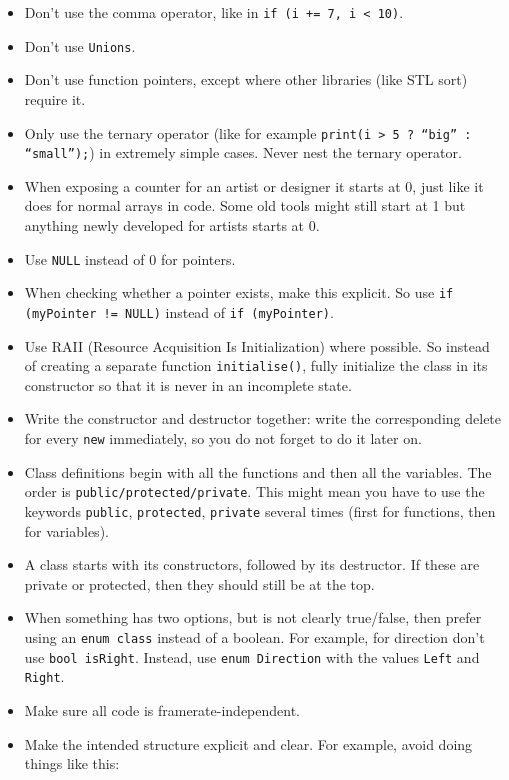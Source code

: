 \documentclass{article}
\begin{document}
\begin{itemize}
    \item Don't use the comma operator, like in \texttt{if (i += 7, i < 10)}.
    \item Don't use \texttt{Unions}.
    \item Don't use function pointers, except where other libraries (like STL sort) require it.
    \item Only use the ternary operator (like for example \texttt{print(i > 5 ? “big” : “small”);}) in extremely simple cases. Never nest the ternary operator.
    \item When exposing a counter for an artist or designer it starts at 0, just like it does for normal arrays in code. Some old tools might still start at 1 but anything newly developed for artists starts at 0.
    \item Use \texttt{NULL} instead of 0 for pointers.
    \item When checking whether a pointer exists, make this explicit. So use \texttt{if (myPointer != NULL)} instead of \texttt{if (myPointer)}.
    \item Use RAII (Resource Acquisition Is Initialization) where possible. So instead of creating a separate function \texttt{initialise()}, fully initialize the class in its constructor so that it is never in an incomplete state.
    \item Write the constructor and destructor together: write the corresponding delete for every \texttt{new} immediately, so you do not forget to do it later on.
    \item Class definitions begin with all the functions and then all the variables. The order is \texttt{public/protected/private}. This might mean you have to use the keywords \texttt{public}, \texttt{protected}, \texttt{private} several times (first for functions, then for variables).
    \item A class starts with its constructors, followed by its destructor. If these are private or protected, then they should still be at the top.
    \item When something has two options, but is not clearly true/false, then prefer using an \texttt{enum class} instead of a boolean. For example, for direction don't use \texttt{bool isRight}. Instead, use \texttt{enum Direction} with the values \texttt{Left} and \texttt{Right}.
    \item Make sure all code is framerate-independent.
    \item Make the intended structure explicit and clear. For example, avoid doing things like this:

\end{itemize}
\end{document}
